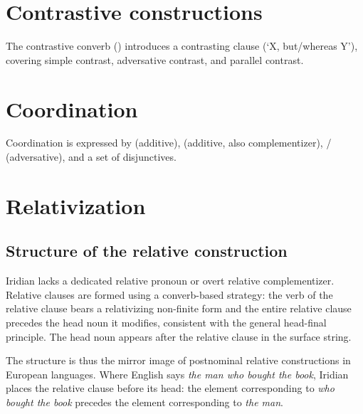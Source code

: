 \section{Contrastive constructions}\label{sec:contrastive}

The contrastive converb () introduces a contrasting clause (`X,
but/whereas Y'), covering simple contrast, adversative contrast, and parallel
contrast.

\section{Coordination}\label{sec:coordination}


Coordination is expressed by  (additive),  (additive, also
complementizer),  /  (adversative), and a set of disjunctives.

\section{Relativization}
\label{sec:th-relativization}

\subsection{Structure of the relative construction}
\label{sec:th-rel-structure}

Iridian lacks a dedicated relative pronoun or overt relative complementizer.
Relative clauses are formed using a converb-based strategy: the verb of the
relative clause bears a relativizing non-finite form and the entire relative
clause precedes the head noun it modifies, consistent with the general
head-final principle. The head noun appears after the relative clause in the
surface string.

\begin{center}
\end{center}

The structure is thus the mirror image of postnominal relative constructions
in European languages. Where English says \textit{the man who bought the
book}, Iridian places the relative clause before its head: the element
corresponding to \textit{who bought the book} precedes the element
corresponding to \textit{the man}.

